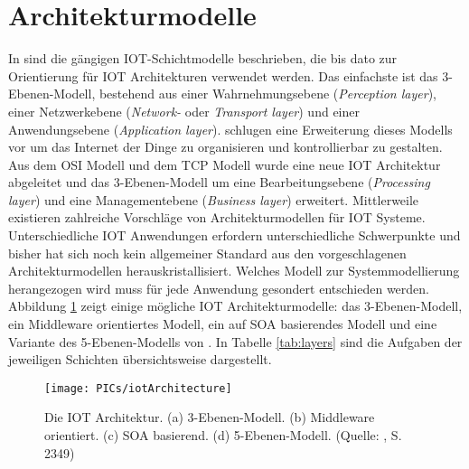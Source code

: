 \documentclass[BMR,Bachelor,ngerman]{twbook}%
\begin{document}
\section{Architekturmodelle}
In  sind die gängigen \ac{IOT}-Schichtmodelle beschrieben, die bis dato zur Orientierung für \ac{IOT} Architekturen verwendet werden. Das einfachste ist das 3-Ebenen-Modell, bestehend aus einer Wahrnehmungsebene (\emph{Perception layer}), einer Netzwerkebene (\emph{Network-} oder \emph{Transport layer}) und einer Anwendungsebene (\emph{Application layer}).
%
 schlugen eine Erweiterung dieses Modells vor um das Internet der Dinge zu organisieren und kontrollierbar zu gestalten. Aus dem \ac{OSI} Modell und dem \ac{TCP} Modell wurde eine neue \ac{IOT} Architektur abgeleitet und das 3-Ebenen-Modell um eine Bearbeitungsebene (\emph{Processing layer}) und eine Managementebene (\emph{Business layer}) erweitert.
%
%
Mittlerweile existieren zahlreiche Vorschläge von Architekturmodellen für \ac{IOT} Systeme. Unterschiedliche \ac{IOT} Anwendungen erfordern unterschiedliche Schwerpunkte und bisher hat sich noch kein allgemeiner Standard aus den vorgeschlagenen Architekturmodellen herauskristallisiert. Welches Modell zur Systemmodellierung herangezogen wird muss für jede Anwendung gesondert entschieden werden. Abbildung \ref{fig:layer} zeigt einige mögliche \ac{IOT} Architekturmodelle: das 3-Ebenen-Modell, ein Middleware orientiertes Modell, ein auf \ac{SOA} basierendes Modell und eine Variante des 5-Ebenen-Modells von . In Tabelle \ref{tab:layers} sind die Aufgaben der jeweiligen Schichten übersichtsweise dargestellt.
\begin{figure}[!htbp]
\centering
\texttt{[image: PICs/iotArchitecture]}
\caption{Die \ac{IOT} Architektur. (a) 3-Ebenen-Modell. (b) Middleware orientiert. (c) SOA basierend. (d) 5-Ebenen-Modell. (Quelle: \protect\cite{alfuqaha2015survey}, S. 2349)}\label{fig:layer}
\end{figure}
\end{document}
